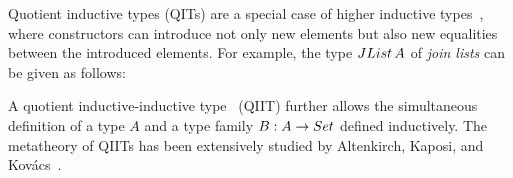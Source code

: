 \documentclass[a4paper,UKenglish,numberwithinsect,cleveref,thm-restate]{lipics-v2021}
\begin{document}
Quotient inductive types (QITs) are a special case of higher inductive types~\cite{Lumsdaine2020}, where constructors can introduce not only new elements but also new equalities between the introduced elements.
%
%
For example, the type $\JList{A}$ of \emph{join lists} can be given as follows:
A quotient inductive-inductive type~\cite{Altenkirch2018} (QIIT) further allows the simultaneous definition of a type $A$ and a type family $B : A \to \Set$ defined inductively.
The metatheory of QIITs has been extensively studied by Altenkirch, Kaposi, and Kov\'acs~\cite{Kaposi2018,Kaposi2019,Kovacs2020}.
\end{document}

